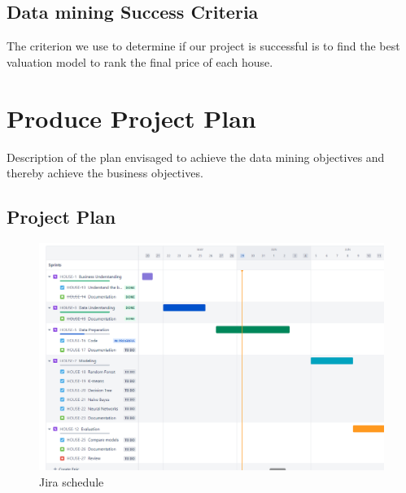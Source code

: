 \subsection{Data mining Success Criteria}
The criterion we use to determine if our project is successful is to find the best valuation model to rank the final price of each house.



\section{Produce Project Plan}
Description of the plan envisaged to achieve the data mining objectives and thereby achieve the business objectives.

\subsection{Project Plan}

\begin{figure}[t]
    \includegraphics[scale=0.45]{imgs/jira_schedule.png}
    \centering
    \caption{Jira schedule}
    \hrulefill\vspace{15pt}\par
\end{figure}

